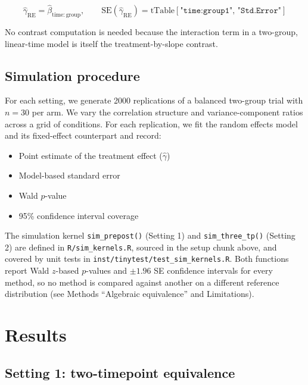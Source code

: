 \documentclass[
  11pt,
]{article}
\providecommand{\tightlist}{%
  \setlength{\itemsep}{0pt}\setlength{\parskip}{0pt}}
\begin{document}
\[
\hat{\gamma}_{\mathrm{RE}} =
\hat{\beta}_{\mathrm{time:group}}, \qquad
\mathrm{SE}(\hat{\gamma}_{\mathrm{RE}}) =
\text{tTable}[\texttt{"time:group1"},\,
\texttt{"Std.Error"}]
\]

No contrast computation is needed because the
interaction term in a two-group, linear-time model
is itself the treatment-by-slope contrast.

\subsection{Simulation procedure}\label{simulation-procedure}

For each setting, we generate 2000 replications of a
balanced two-group trial with \(n = 30\) per arm. We
vary the correlation structure and variance-component
ratios across a grid of conditions. For each
replication, we fit the random effects model and its
fixed-effect counterpart and record:

\begin{itemize}
\tightlist
\item
  Point estimate of the treatment effect
  (\(\hat{\gamma}\))
\item
  Model-based standard error
\item
  Wald \(p\)-value
\item
  95\% confidence interval coverage
\end{itemize}

The simulation kernel \texttt{sim\_prepost()} (Setting 1) and
\texttt{sim\_three\_tp()} (Setting 2) are defined in
\texttt{R/sim\_kernels.R}, sourced in the setup chunk above, and
covered by unit tests in
\texttt{inst/tinytest/test\_sim\_kernels.R}. Both functions report
Wald \(z\)-based \(p\)-values and \(\pm 1.96\) SE confidence
intervals for every method, so no method is compared
against another on a different reference distribution
(see Methods ``Algebraic equivalence'' and Limitations).

\FloatBarrier

\section{Results}\label{results}

\subsection{Setting 1: two-timepoint equivalence}\label{setting-1-two-timepoint-equivalence}
\end{document}
